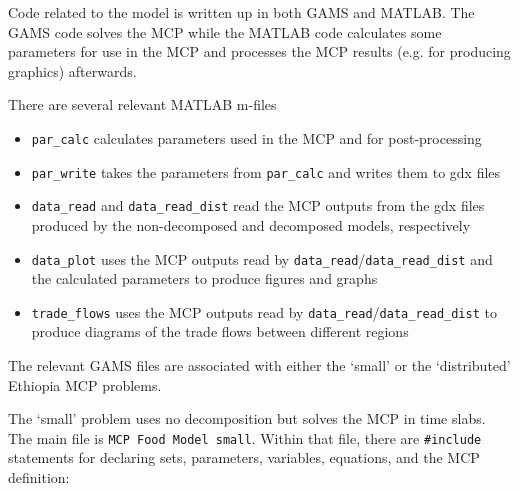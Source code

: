 \documentclass[letter,12pt]{article}
\begin{document}
Code related to the model is written up in both GAMS and MATLAB.  The GAMS code solves the MCP while the MATLAB code calculates some parameters for use in the MCP and processes the MCP results (e.g. for producing graphics) afterwards.

There are several relevant MATLAB m-files

\begin{itemize}
\item \verb!par_calc! calculates parameters used in the MCP and for post-processing
\item \verb!par_write! takes the parameters from \verb!par_calc! and writes them to gdx files
\item \verb!data_read! and \verb!data_read_dist! read the MCP outputs from the gdx files produced by the non-decomposed and decomposed models, respectively
\item \verb!data_plot! uses the MCP outputs read by \verb!data_read!/\verb!data_read_dist! and the calculated parameters to produce figures and graphs
\item \verb!trade_flows! uses the MCP outputs read by \verb!data_read!/\verb!data_read_dist! to produce diagrams of the trade flows between different regions
\end{itemize}

The relevant GAMS files are associated with either the `small' or the `distributed' Ethiopia MCP problems.

The `small' problem uses no decomposition but solves the MCP in time slabs.  The main file is \verb!MCP Food Model small!.  Within that file, there are \verb!#include! statements for declaring sets, parameters, variables, equations, and the MCP definition:
\end{document}
